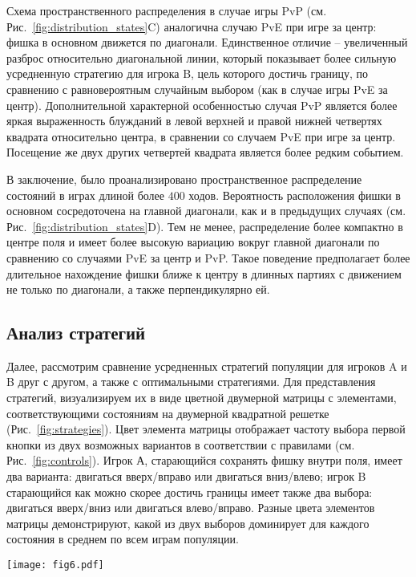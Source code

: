 Схема пространственного распределения в случае игры PvP (см. Рис.~\cref{fig:distribution_states}C) аналогична случаю PvE при игре за центр: фишка в основном движется по диагонали. Единственное отличие -- увеличенный разброс относительно диагональной линии, который показывает более сильную усредненную стратегию для игрока B, цель которого достичь границу, по сравнению с равновероятным случайным выбором (как в случае игры PvE за центр). Дополнительной характерной особенностью случая PvP является более яркая выраженность блужданий в левой верхней и правой нижней четвертях квадрата относительно центра, в сравнении со случаем PvE при игре за центр. Посещение же двух других четвертей квадрата является более редким событием.

В заключение, было проанализировано пространственное распределение состояний в играх длиной более $400$ ходов. Вероятность расположения фишки в основном сосредоточена на главной диагонали, как и в предыдущих случаях (см. Рис.~\cref{fig:distribution_states}D). Тем не менее, распределение более компактно в центре поля и имеет более высокую вариацию вокруг главной диагонали по сравнению со случаями PvE за центр и PvP. Такое поведение предполагает более длительное нахождение фишки ближе к центру в длинных партиях с движением не только по диагонали, а также перпендикулярно ей.

\subsection{Анализ стратегий}\label{subsec:ch3/sec4/sub5}

Далее, рассмотрим сравнение усредненных стратегий популяции для игроков A и B друг с другом, а также с оптимальными стратегиями. Для представления стратегий, визуализируем их в виде цветной двумерной матрицы с элементами, соответствующими состояниям на двумерной квадратной решетке (Рис.~\cref{fig:strategies}). 
Цвет элемента матрицы отображает частоту выбора первой кнопки из двух возможных вариантов в соответствии с правилами (см. Рис.~\cref{fig:controls}). Игрок А, старающийся сохранять фишку внутри поля, имеет два варианта: двигаться вверх/вправо или двигаться вниз/влево; игрок B старающийся как можно скорее достичь границы имеет также два выбора: двигаться вверх/вниз или двигаться влево/вправо. Разные цвета элементов матрицы демонстрируют, какой из двух выборов доминирует для каждого состояния в среднем по всем играм популяции.

\begin{figure*}[t]
    \centering
    \texttt{[image: fig6.pdf]}
    \caption{
        Визуализация средних популяционных стратегий для разных режимов, полученных в эксперименте. 
        Цвет ячеек отображает частоту выбора первой чистой стратегии: для игры за центр (A, B, C) и для игры за границу (D, E, F).
    }  
    \label{fig:strategies}
    
\end{figure*}

